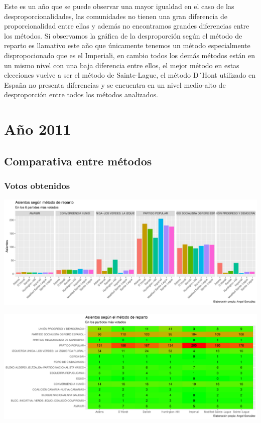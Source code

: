 \documentclass[12pt,a4paper,]{book}
\numberwithin{dummy}{section}
\theoremstyle{ocrenumbox}
\theoremstyle{blacknumex}
\theoremstyle{blacknumbox}
\theoremstyle{ocrenum}
\theoremstyle{ocrenum}
\begin{document}
Este es un año que se puede observar una mayor igualdad en el caso de
las desproporcionalidades, las comunidades no tienen una gran diferencia
de proporcionalidad entre ellas y además no encontramos grandes
diferencias entre los métodos. Si observamos la gráfica de la
desproporción según el método de reparto es llamativo este año que
únicamente tenemos un método especialmente dispropocionado que es el
Imperiali, en cambio todos los demás métodos están en un mismo nivel con
una baja diferencia entre ellos, el mejor método en estas elecciones
vuelve a ser el método de Sainte-Lague, el método D´Hont utilizado en
España no presenta diferencias y se encuentra en un nivel medio-alto de
desproporción entre todos los métodos analizados.

\hypertarget{auxf1o-2011}{%
\section{Año 2011}\label{auxf1o-2011}}

\hypertarget{comparativa-entre-muxe9todos-10}{%
\subsection{Comparativa entre
métodos}\label{comparativa-entre-muxe9todos-10}}

\hypertarget{votos-obtenidos-10}{%
\subsubsection{Votos obtenidos}\label{votos-obtenidos-10}}

\begin{center}\includegraphics[width=0.95\linewidth]{figurasR/unnamed-chunk-149-1} \end{center}

\begin{center}\includegraphics[width=0.95\linewidth]{figurasR/unnamed-chunk-149-2} \end{center}
\end{document}
